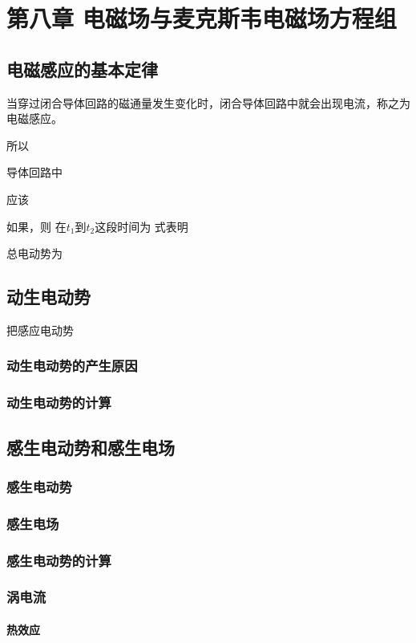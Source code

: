 \chapter{第八章 电磁场与麦克斯韦电磁场方程组}

\section{电磁感应的基本定律}
    当穿过闭合导体回路的磁通量发生变化时，闭合导体回路中就会出现电流，称之为电磁感应。

    所以

    导体回路中

    应该

    如果，则
    在$t_1$到$t_2$这段时间为
    式表明

    总电动势为

\section{动生电动势}
    把感应电动势
    \subsection{动生电动势的产生原因}
    \subsection{动生电动势的计算}

\section{感生电动势和感生电场}
    \subsection{感生电动势}
    \subsection{感生电场}
    \subsection{感生电动势的计算}
    \subsection{涡电流}
        \subsubsection{热效应}
